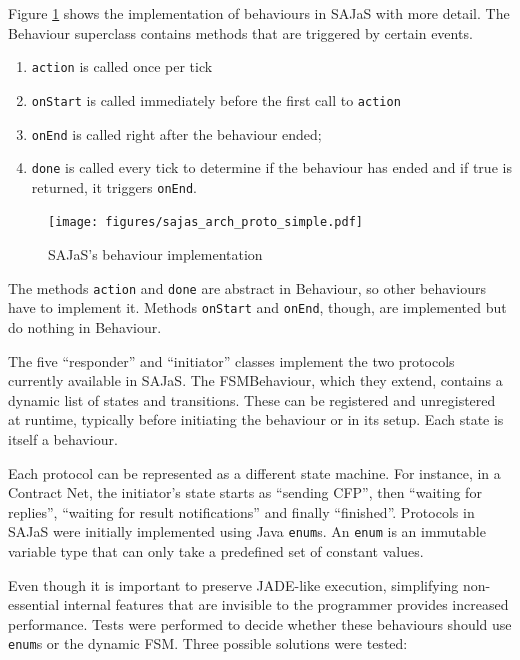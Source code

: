 \documentclass[a4paper,twoside]{article}
\begin{document}
Figure \ref{fig:arch_proto} shows the implementation of behaviours in SAJaS with more detail. The Behaviour superclass contains methods that are triggered by certain events.

\begin{enumerate}
	\item \texttt{action} is called once per tick
	\item \texttt{onStart} is called immediately before the first call to \texttt{action}
	\item \texttt{onEnd} is called right after the behaviour ended;
	\item \texttt{done} is called every tick to determine if the behaviour has ended and if true is returned, it triggers \texttt{onEnd}.
\end{enumerate}

\begin{figure}[h]
	\centering
	\texttt{[image: figures/sajas\_arch\_proto\_simple.pdf]}
	\caption{SAJaS's behaviour implementation}
	\label{fig:arch_proto}
\end{figure}

The methods \texttt{action} and \texttt{done} are abstract in Behaviour, so  other behaviours have to implement it. Methods \texttt{onStart} and \texttt{onEnd}, though, are implemented but do nothing in Behaviour.

The five ``responder'' and ``initiator'' classes implement the two protocols currently available in SAJaS. The FSMBehaviour, which they extend, contains a dynamic list of states and transitions. These can be registered and unregistered at runtime, typically before initiating the behaviour or in its setup. Each state is itself a behaviour.

Each protocol can be represented as a different state machine. For instance, in a Contract Net, the initiator's state starts as ``sending CFP'', then ``waiting for replies'', ``waiting for result notifications'' and finally ``finished''. Protocols in SAJaS were initially implemented using Java \texttt{enum}s. An \texttt{enum} is an immutable variable type that can only take a predefined set of constant values.

Even though it is important to preserve JADE-like execution, simplifying non-essential internal features that are invisible to the programmer provides increased performance. Tests were performed to decide whether these behaviours should use \texttt{enum}s or the dynamic FSM. Three possible solutions were tested:
\end{document}
